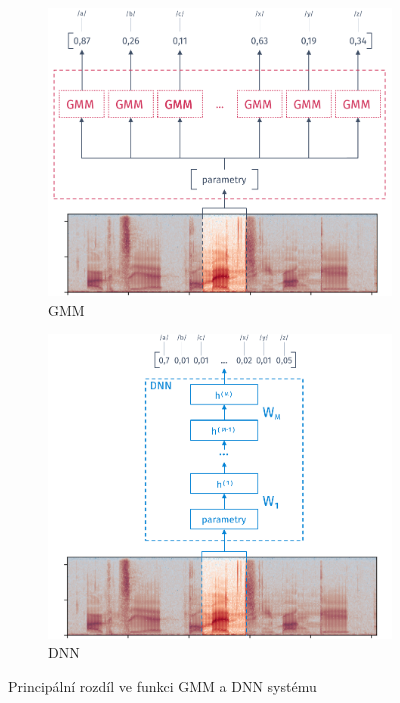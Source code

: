 \begin{figure}[htpb]
  \centering
  \begin{subfigure}[b]{0.4\textwidth}
    \includegraphics[width=\textwidth]{./ch4-asr/img/hmm-gmm.pdf}
    \caption{GMM}
    \label{fig:asr:acoustic:dnn:asr:diff:dnn}
  \end{subfigure}
  \begin{subfigure}[b]{0.4\textwidth}
    \includegraphics[width=\textwidth]{./ch4-asr/img/hmm-dnn.pdf}
    \caption{DNN}
    \label{fig:asr:acoustic:dnn:asr:diff:dnn}
  \end{subfigure}
  \caption{Principální rozdíl ve funkci GMM a DNN systému}
  \label{fig:asr:acoustic:dnn:asr:diff}
\end{figure}

